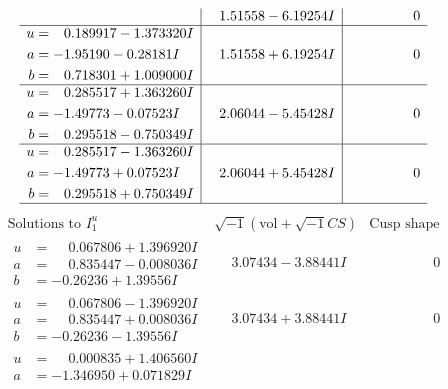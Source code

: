 \documentclass[1p]{elsarticle_modified}
\theoremstyle{definition}
\newcommand{\I}{\sqrt{-1}}
\begin{document}
$$\begin{array}{c|c|c}
 & \phantom{-}1.51558 - 6.19254 I & \phantom{-0.000000 } 0 \\ \hline\begin{aligned}
u &= \phantom{-}0.189917 - 1.373320 I \\
a &= -1.95190 - 0.28181 I \\
b &= \phantom{-}0.718301 + 1.009000 I\end{aligned}
 & \phantom{-}1.51558 + 6.19254 I & \phantom{-0.000000 } 0 \\ \hline\begin{aligned}
u &= \phantom{-}0.285517 + 1.363260 I \\
a &= -1.49773 - 0.07523 I \\
b &= \phantom{-}0.295518 - 0.750349 I\end{aligned}
 & \phantom{-}2.06044 - 5.45428 I & \phantom{-0.000000 } 0 \\ \hline\begin{aligned}
u &= \phantom{-}0.285517 - 1.363260 I \\
a &= -1.49773 + 0.07523 I \\
b &= \phantom{-}0.295518 + 0.750349 I\end{aligned}
 & \phantom{-}2.06044 + 5.45428 I & \phantom{-0.000000 } 0\\
 \hline 
 \end{array}$$\newpage$$\begin{array}{c|c|c}  
\text{Solutions to }I^u_{1}& \I (\text{vol} + \sqrt{-1}CS) & \text{Cusp shape}\\
 \hline 
\begin{aligned}
u &= \phantom{-}0.067806 + 1.396920 I \\
a &= \phantom{-}0.835447 - 0.008036 I \\
b &= -0.26236 + 1.39556 I\end{aligned}
 & \phantom{-}3.07434 - 3.88441 I & \phantom{-0.000000 } 0 \\ \hline\begin{aligned}
u &= \phantom{-}0.067806 - 1.396920 I \\
a &= \phantom{-}0.835447 + 0.008036 I \\
b &= -0.26236 - 1.39556 I\end{aligned}
 & \phantom{-}3.07434 + 3.88441 I & \phantom{-0.000000 } 0 \\ \hline\begin{aligned}
u &= \phantom{-}0.000835 + 1.406560 I \\
a &= -1.346950 + 0.071829 I \\

\end{aligned}
\end{array}$$
\end{document}
